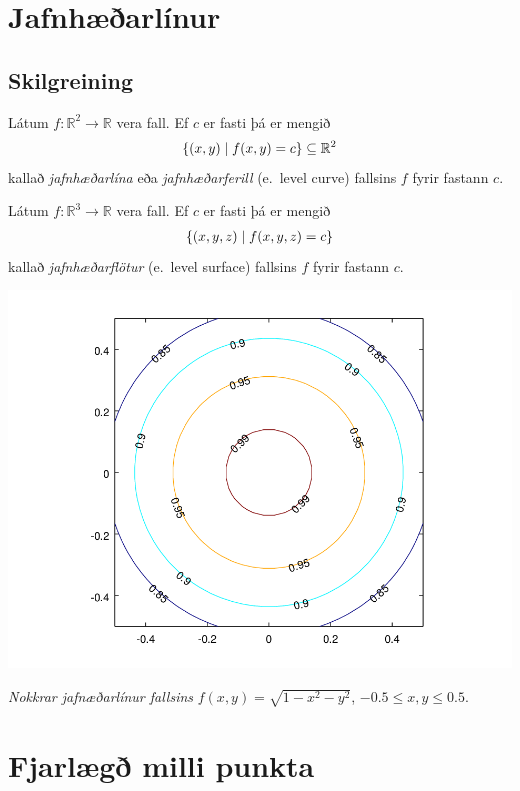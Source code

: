 \documentclass[a4paper,10pt,icelandic]{sphinxmanual}
\begin{document}
\section{Jafnhæðarlínur}
\label{Kafli2:jafnhaearlinur}

\subsection{Skilgreining}
\label{Kafli2:id1}\label{Kafli2:index-1}
Látum \(f:{\mathbb  R}^2\rightarrow {\mathbb  R}\) vera fall. Ef
\(c\) er fasti þá er mengið
\begin{gather}
\begin{split}\displaystyle \{(x,y)\mid f(x,y)=c\}\subseteq {\mathbb  R}^2\end{split}\notag
\end{gather}
kallað \emph{jafnhæðarlína} eða \emph{jafnhæðarferill} (e. level curve) fallsins
\(f\) fyrir fastann \(c\).

Látum \(f:{\mathbb  R}^3\rightarrow {\mathbb  R}\) vera fall. Ef
\(c\) er fasti þá er mengið
\begin{gather}
\begin{split}\displaystyle \{(x,y,z)\mid f(x,y,z)=c\}\end{split}\notag
\end{gather}
kallað \emph{jafnhæðarflötur} (e. level surface) fallsins \(f\) fyrir
fastann \(c\).

{\hfill\includegraphics[width=0.600\linewidth]{contour.png}\hfill}

\emph{Nokkrar jafnæðarlínur fallsins} \(f(x,y) = \sqrt{1-x^2-y^2}\), \(-0.5\leq x,y\leq 0.5\).


\section{Fjarlægð milli punkta}
\label{Kafli2:fjarlaeg-milli-punkta}
\end{document}
